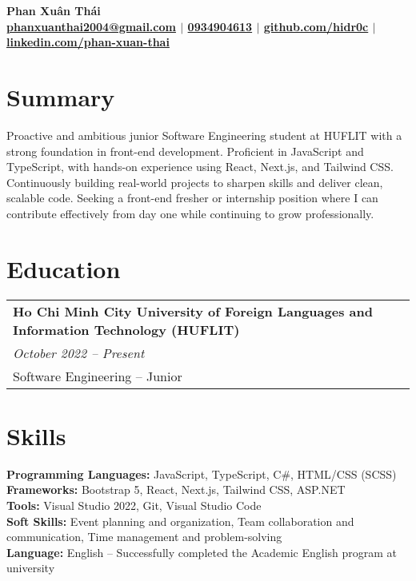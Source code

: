\documentclass[a4paper,11pt]{article}
\begin{document}
\pagestyle{empty}

\begin{center}
\LARGE\textbf{Phan Xuân Thái} \\[2pt]
\small\textbf{\href{mailto:phanxuanthai2004@gmail.com}{phanxuanthai2004@gmail.com} $|$ 
\href{tel:0934904613}{0934904613} $|$ 
\href{https://github.com/hidr0c}{github.com/hidr0c} $|$ 
\href{https://www.linkedin.com/in/xuân-thái-phan-bab693352/}{linkedin.com/phan-xuan-thai}}
\\
\end{center}

\section{Summary}
Proactive and ambitious junior Software Engineering student at HUFLIT with a strong foundation in front-end development. Proficient in JavaScript and TypeScript, with hands-on experience using React, Next.js, and Tailwind CSS. Continuously building real-world projects to sharpen skills and deliver clean, scalable code. Seeking a front-end fresher or internship position where I can contribute effectively from day one while continuing to grow professionally.

\section{Education}
\begin{tabularx}{\linewidth}{@{}l@{}}
\textbf{Ho Chi Minh City University of Foreign Languages and Information Technology (HUFLIT)} \\
\small\textit{October 2022 -- Present} \\
Software Engineering -- Junior
\end{tabularx}

\section{Skills}
\textbf{Programming Languages:} JavaScript, TypeScript, C\#, HTML/CSS (SCSS) \\
\textbf{Frameworks:} Bootstrap 5, React, Next.js, Tailwind CSS, ASP.NET \\
\textbf{Tools:} Visual Studio 2022, Git, Visual Studio Code \\
\textbf{Soft Skills:} Event planning and organization, Team collaboration and communication, Time management and problem-solving \\
\textbf{Language:} English – Successfully completed the Academic English program at university
\end{document}
